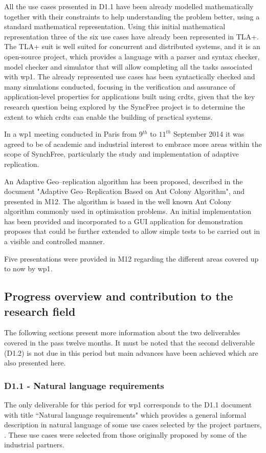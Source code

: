 \documentclass[12pt,twoside]{article}
\begin{document}
All the use cases presented in D1.1 have been already modelled mathematically together with their constraints to help understanding the problem better, using a standard mathematical representation. Using this initial mathematical representation three of the six use cases have already been represented in TLA+. The TLA+ suit is well suited for concurrent and distributed systems, and it is an open-source project, which provides a language with a parser and syntax checker, model checker and simulator that will allow completing all the tasks associated with \gls{wp1}. The already represented use cases has been syntactically checked and many simulations conducted,  focusing in the verification and assurance of application-level properties for applications built using \glspl{crdt}, given that the key research question being explored by the SyncFree project is to determine the extent to which \glspl{crdt} can enable the building of practical systems.

In a \gls{wp1} meeting conducted in Paris from 9$^{th}$ to $11^{th}$ September 2014 it was agreed to be of academic and industrial interest to embrace more areas within the scope of SynchFree, particularly the study and implementation of adaptive replication.

An Adaptive Geo--replication algorithm has been proposed, described in the document "Adaptive Geo--Replication Based on Ant Colony Algorithm", and presented in M12. The algorithm is based in the well known Ant Colony algorithm commonly used in optimisation problems. An initial implementation has been provided and incorporated to a GUI application for demonstration proposes that could be further extended to allow simple tests to be carried out in a visible and controlled manner.

Five presentations were provided in M12 regarding the different areas covered up to now by \gls{wp1}.


\subsection{Progress overview and contribution to the research field}
The following sections present more information about the two deliverables covered in the pass twelve months. It must be noted that the second deliverable (D1.2) is not due in this period but main advances have been achieved which are also presented here.


\subsubsection{D1.1 - Natural language requirements}
The only deliverable for this period for \gls{wp1} corresponds to the D1.1 document with title ``Natural language requirements" which provides a general informal description in natural language of some use cases selected by the project partners, \cite{Benedictus2014a}. These use cases were selected from those originally proposed by some of the industrial partners.
\end{document}
